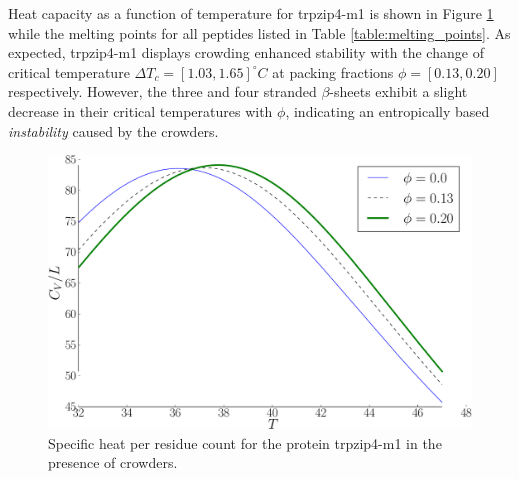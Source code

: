 Heat capacity as a function of temperature for trpzip4-m1 is shown in Figure \ref{fig:trpzip_CV_plot} while the melting points for all peptides listed in Table \ref{table:melting_points}.  As expected, trpzip4-m1 displays crowding enhanced stability with the change of critical temperature $\Delta T_c=[1.03, 1.65] ^\circ C$ at packing fractions $\phi=[0.13, 0.20]$ respectively. However, the three and four stranded $\beta$-sheets exhibit a slight decrease in their critical temperatures with $\phi$, indicating an entropically based \textit{instability} caused by the crowders. 
\begin{figure}[ht]
\includegraphics[width=\figurewidthSINGLE]{tex/WL_crowding_paper/PLOT_trpzip_CV-crop.pdf}
\caption{Specific heat per residue count for the protein trpzip4-m1 in the presence of crowders.}
\label{fig:trpzip_CV_plot}
\end{figure}


